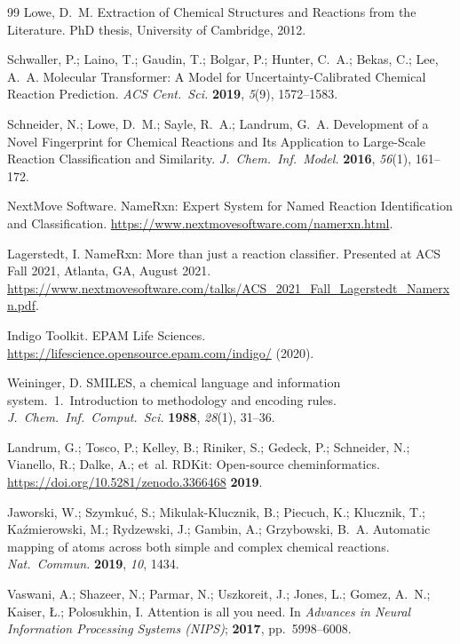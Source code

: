\documentclass[12pt]{article}
\begin{document}
\begin{thebibliography}{99}
  Lowe, D.~M.
  Extraction of Chemical Structures and Reactions from the Literature.
  PhD thesis, University of Cambridge, 2012.

  Schwaller, P.; Laino, T.; Gaudin, T.; Bolgar, P.; Hunter, C.~A.;
  Bekas, C.; Lee, A.~A.
  Molecular Transformer: A Model for Uncertainty-Calibrated Chemical
  Reaction Prediction.
  \emph{ACS Cent.\ Sci.} \textbf{2019}, \emph{5}(9), 1572--1583.

  Schneider, N.; Lowe, D.~M.; Sayle, R.~A.; Landrum, G.~A.
  Development of a Novel Fingerprint for Chemical Reactions and Its
  Application to Large-Scale Reaction Classification and Similarity.
  \emph{J.\ Chem.\ Inf.\ Model.} \textbf{2016}, \emph{56}(1), 161--172.

  NextMove Software.
  NameRxn: Expert System for Named Reaction Identification and Classification.
  \url{https://www.nextmovesoftware.com/namerxn.html}.

  Lagerstedt, I.
  NameRxn: More than just a reaction classifier.
  Presented at ACS Fall 2021, Atlanta, GA, August 2021.
  \url{https://www.nextmovesoftware.com/talks/ACS_2021_Fall_Lagerstedt_Namerxn.pdf}.

  Indigo Toolkit.
  EPAM Life Sciences.
  \url{https://lifescience.opensource.epam.com/indigo/} (2020).

  Weininger, D.
  SMILES, a chemical language and information system.\ 1.\ Introduction to
  methodology and encoding rules.
  \emph{J.\ Chem.\ Inf.\ Comput.\ Sci.} \textbf{1988}, \emph{28}(1), 31--36.

  Landrum, G.; Tosco, P.; Kelley, B.; Riniker, S.; Gedeck, P.; Schneider, N.;
  Vianello, R.; Dalke, A.; et~al.
  RDKit: Open-source cheminformatics.
  \url{https://doi.org/10.5281/zenodo.3366468} \textbf{2019}.

  Jaworski, W.; Szymku\'{c}, S.; Mikulak-Klucznik, B.; Piecuch, K.;
  Klucznik, T.; Ka\'{z}mierowski, M.; Rydzewski, J.; Gambin, A.;
  Grzybowski, B.~A.
  Automatic mapping of atoms across both simple and complex chemical reactions.
  \emph{Nat.\ Commun.} \textbf{2019}, \emph{10}, 1434.

  Vaswani, A.; Shazeer, N.; Parmar, N.; Uszkoreit, J.; Jones, L.;
  Gomez, A.~N.; Kaiser, {\L}.; Polosukhin, I.
  Attention is all you need.
  In \emph{Advances in Neural Information Processing Systems (NIPS)};
  \textbf{2017}, pp.\ 5998--6008.


\end{thebibliography}
\end{document}
